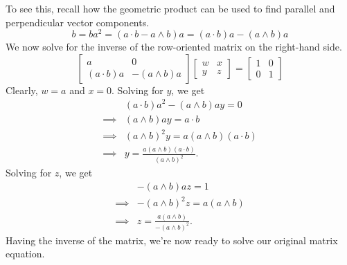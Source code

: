 \documentclass{article}
\begin{document}
To see this, recall how the geometric product can be used to find parallel
and perpendicular vector components.
\begin{equation*}
b = ba^2 = (a\cdot b-a\wedge b)a = (a\cdot b)a - (a\wedge b)a
\end{equation*}
We now solve for the inverse of the row-oriented matrix on the right-hand side.
\begin{equation*}
\left[\begin{array}{cc}a&0\\(a\cdot b)a&-(a\wedge b)a\end{array}\right]
\left[\begin{array}{cc}w&x\\y&z\end{array}\right] =
\left[\begin{array}{cc}1&0\\0&1\end{array}\right]
\end{equation*}
Clearly, $w=a$ and $x=0$.
Solving for $y$, we get
\begin{align*}
 & (a\cdot b)a^2-(a\wedge b)ay = 0 \\
\implies& (a\wedge b)ay = a\cdot b \\
\implies& (a\wedge b)^2y = a(a\wedge b)(a\cdot b) \\
\implies& y = \frac{a(a\wedge b)(a\cdot b)}{(a\wedge b)^2}.
\end{align*}
Solving for $z$, we get
\begin{align*}
 & -(a\wedge b)az = 1 \\
\implies& -(a\wedge b)^2z = a(a\wedge b) \\
\implies& z = \frac{a(a\wedge b)}{-(a\wedge b)^2}.
\end{align*}
Having the inverse of the matrix, we're now ready to solve our original matrix equation.
\end{document}
